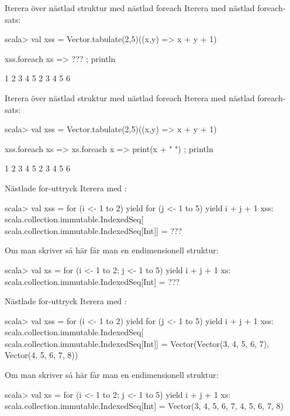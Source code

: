 \begin{Slide}{Iterera över nästlad struktur med nästlad foreach}\SlideFontSmall
Iterera med nästlad foreach-sats:
\begin{REPL}
scala> val xss = Vector.tabulate(2,5)((x,y) => x + y + 1)

xss.foreach{ xs => ??? ; println }

1 2 3 4 5
2 3 4 5 6
\end{REPL}
\end{Slide}


\begin{Slide}{Iterera över nästlad struktur med nästlad foreach}\SlideFontSmall
Iterera med nästlad foreach-sats:
\begin{REPL}
scala> val xss = Vector.tabulate(2,5)((x,y) => x + y + 1)

xss.foreach{ xs => xs.foreach{ x => print(x + " ") }; println }

1 2 3 4 5
2 3 4 5 6
\end{REPL}
\end{Slide}


\begin{Slide}{Nästlade for-uttryck}\SlideFontSmall
Iterera med :\\

\begin{REPL}
scala> val xss = for (i <- 1 to 2) yield {
                   for (j <- 1 to 5) yield i + j + 1
                 }
xss:
  scala.collection.immutable.IndexedSeq[
    scala.collection.immutable.IndexedSeq[Int]] =
      ???

\end{REPL}
Om man skriver så här får man en endimensionell struktur:
\begin{REPL}
scala> val xs = for (i <- 1 to 2; j <- 1 to 5) yield i + j + 1
xs:
  scala.collection.immutable.IndexedSeq[Int] =
    ???

\end{REPL}
\end{Slide}

\begin{Slide}{Nästlade for-uttryck}\SlideFontSmall
Iterera med :\\
\begin{REPL}
scala> val xss = for (i <- 1 to 2) yield {
                   for (j <- 1 to 5) yield i + j + 1
                 }
xss:
  scala.collection.immutable.IndexedSeq[
    scala.collection.immutable.IndexedSeq[Int]] =
      Vector(Vector(3, 4, 5, 6, 7), Vector(4, 5, 6, 7, 8))

\end{REPL}
Om man skriver så här får man en endimensionell struktur:
\begin{REPL}
scala> val xs = for (i <- 1 to 2; j <- 1 to 5) yield i + j + 1
xs:
  scala.collection.immutable.IndexedSeq[Int] =
    Vector(3, 4, 5, 6, 7, 4, 5, 6, 7, 8)

\end{REPL}
\end{Slide}



